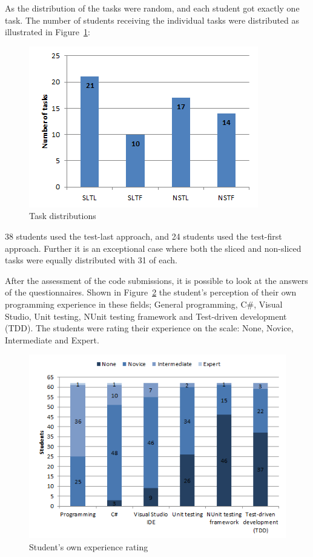 \documentclass{sig-alternate-05-2015}
\begin{document}
As the distribution of the tasks were random, and each student got exactly one task. The number of students receiving the individual tasks were distributed as illustrated in Figure~\ref{fig:TaskDistributions}:

\begin{figure}[!ht]
	\centering
	\includegraphics[width=1\linewidth]{img02}
	\caption{Task distributions}
	\label{fig:TaskDistributions}
\end{figure}

38 students used the test-last approach, and 24 students used the test-first approach. Further it is an exceptional case where both the sliced and non-sliced tasks were equally distributed with 31 of each.

After the assessment of the code submissions, it is possible to look at the answers of the questionnaires. Shown in Figure~\ref{fig:Student's own experience rating} the student's perception of their own programming experience in these fields; General programming, C{\#}, Visual Studio, Unit testing, NUnit testing framework and Test-driven development (TDD).
The students were rating their experience on the scale: None, Novice, Intermediate and Expert.

\begin{figure}[!ht]
	\centering
	\includegraphics[width=1\linewidth]{img03}
	\caption{Student's own experience rating}
	\label{fig:Student's own experience rating}
\end{figure}
\end{document}
